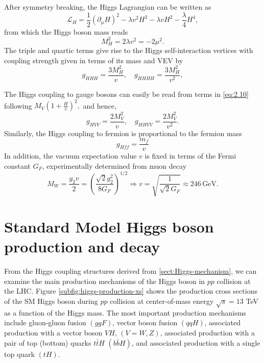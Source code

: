 After symmetry breaking, the Higgs Lagrangian can be written as
\begin{equation}
    \label{eq:2.18}
    \mathcal{L}_H = \frac{1}{2}(\partial_{\mu} H)^2 - \lambda v^2H^2 - \lambda v H^2 - \frac{\lambda}{4}H^4,
\end{equation}
from which the Higgs boson mass reads 
\begin{equation}
    \label{eq:2.19}
    M_H^2 = 2\lambda v^2 = -2\mu^2.
\end{equation}
The triple and quartic terms give rise to the Higgs self-interaction vertices with coupling strength given in terms of its mass and VEV by 
\begin{equation}
    \label{eq:2.20}
    g_{HHH} = \frac{3M_H^2}{v}, \quad g_{HHHH} = \frac{3M_H^2}{v^2},
\end{equation}

The Higgs coupling to gauge bosons can easily be read from terms in \eqref{eq:2.10} following $M_V\left(1+\frac{H}{v}\right)^2,$
and hence,
\begin{equation}
    \label{eq:2.21}
    g_{HVV} = \frac{2M_V^2}{v}, \quad g_{HHVV} = \frac{2M_V^2}{v^2}.
\end{equation}
Similarly, the Higgs coupling to fermion is proportional to the fermion mass
\begin{equation}
    \label{eq:2.22}
    g_{Hff} = \frac{m_f}{v}
\end{equation}
In addition, the vacuum expectation value $v$ is fixed in terms of the Fermi constant $G_F$, experimentally determined from muon decay
\begin{equation}
    \label{eq:2.23}
    M_W = \frac{g_2v}{2}  = \left(\frac{\sqrt{2}g_2^2}{8G_F}\right)^{1/2} \Rightarrow v = \sqrt{\frac{1}{\sqrt{2}G_F}} \approx 246 \,\mathrm{GeV}.
\end{equation}

\section{Standard Model Higgs boson production and decay}
\label{sect:higgs-production}
From the Higgs coupling structures derived from \ref{sect:Higgs-mechanism}, we can examine the main production mechanisms of the Higgs boson in $pp$ collision at the LHC. Figure \ref{subfig:higgs-production-xs} shows the production cross sections of the SM Higgs boson during $pp$ collision at center-of-mass energy $\sqrt{s}=13$ TeV as a function of the Higgs mass. 
The most important production mechanisms include gluon-gluon fusion $(ggF)$, vector boson fusion $(qqH)$, associated production with a vector boson $VH,\,(V=W,Z)$, associated production with a pair of top (bottom) quarks $t\bar{t}H$ $(b\bar{b}H)$, and associated production with a single top quark $(tH)$.


